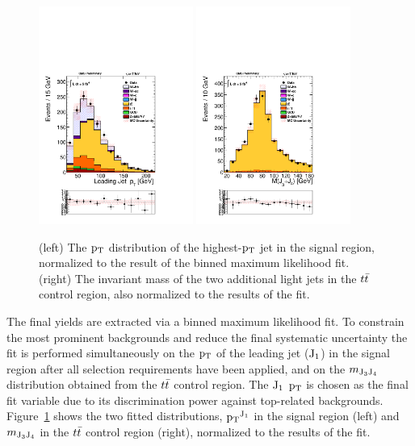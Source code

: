 \begin{figure}
\centering
\includegraphics[width=0.45\textwidth, trim = 0 4cm 0 0, clip=true ]{Wbb/fig4.pdf}
\includegraphics[width=0.45\textwidth, trim = 0 4cm 0 0, clip=true ]{Wbb/fig3.pdf}
\caption{ 
(left) The $\mathrm{p_{T}}$ distribution of the highest-$\mathrm{p_{T}}$ jet in the signal region, normalized to the result of the binned maximum likelihood fit.
(right) The invariant mass of the two additional light jets in the $t\bar{t}$ control region, also
normalized to the results of the fit.
}
\label{fig:figB}
\end{figure}

The final yields are extracted via a binned maximum likelihood fit.
To constrain the most prominent backgrounds and reduce the final
systematic uncertainty the fit is performed simultaneously on the $\mathrm{p_{T}}$ of the leading jet ($\rm{J_1}$) 
in the signal region after all selection requirements have been applied,
and on the $m_{\rm{J_3 J_4}}$ distribution obtained from the $t\bar{t}$ control region.
The  $\rm{J_1}$ $\mathrm{p_{T}}$  is chosen as the final fit variable due to its discrimination power against top-related backgrounds.
Figure~\ref{fig:figB} shows the two fitted distributions, $\mathrm{p_{T}}^{\rm{J_1}}$  in the signal region (left)
and $m_{\rm{J_3 J_4}}$ in the $t\bar{t}$ control region (right), normalized to the results of the fit.

